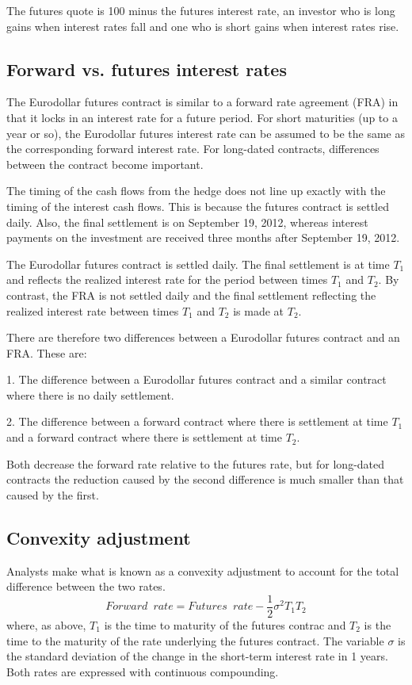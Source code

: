 \documentclass{article}
\begin{document}
The futures quote is 100 minus the futures interest rate, an investor who is long gains when interest rates fall and one who is short gains when interest rates rise.

\subsection{Forward vs. futures interest rates}
The Eurodollar futures contract is similar to a forward rate agreement (FRA) in that it locks in an interest rate for a future period. For short maturities (up to a year or so), the Eurodollar futures interest rate can be assumed to be the same as the corresponding  forward interest rate. For long-dated contracts, differences between the contract become important.

The timing of the cash flows from the hedge does not line up exactly with the timing of the interest cash flows. This is because the futures contract is settled daily. Also, the final settlement is on September 19, 2012, whereas interest payments on the investment are received three months after September 19, 2012.

The Eurodollar futures contract is settled daily. The final settlement is at time $ T_1 $ and reflects the realized interest rate for the period between times $ T_1 $ and $ T_2 $. By contrast, the FRA is not settled daily and the final settlement reflecting the realized interest rate between times $ T_1 $ and $ T_2 $ is made at $ T_2 $.

There are therefore two differences between a Eurodollar futures contract and an FRA. These are:

1. The difference between a Eurodollar futures contract and a similar contract where there is no daily settlement.

2. The difference between a forward contract where there is settlement at time $ T_1 $ and a forward contract where there is settlement at time $ T_2 $.

Both decrease the forward rate relative to the futures rate, but for long-dated contracts the reduction caused by the second difference is much smaller than that caused by the first.

\subsection{Convexity adjustment}
Analysts make what is known as a convexity adjustment to account for the total difference between the two rates.
\begin{equation}
	Forward\enspace rate= Futures\enspace rate- \frac{1}{2}\sigma^2T_1T_2
\end{equation}
where, as above, $ T_1 $ is the time to maturity of the futures contrac and $ T_2 $ is the time to the maturity of the rate underlying the futures contract. The variable $ \sigma $ is the standard deviation of the change in the short-term interest rate in 1 years. Both rates are expressed with continuous compounding.
\end{document}
